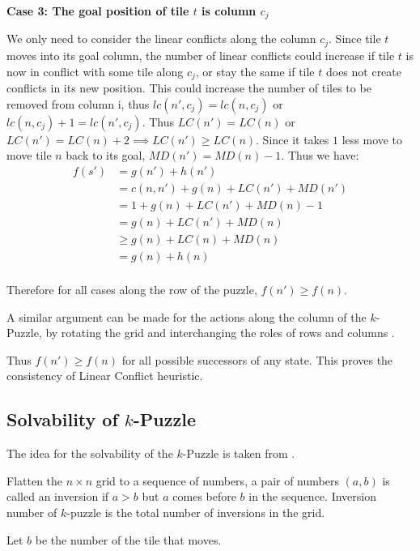 \documentclass{llncs}
\begin{document}
\textbf{Case 3: The goal position of tile $t$ is column $c_j$}

We only need to consider the linear conflicts along the column $c_j$. Since tile $t$ moves into its goal column, the number of linear conflicts could increase if tile $t$ is now in conflict with some tile along $c_j$, or stay the same if tile $t$ does not create conflicts in its new position. This could increase the number of tiles to be removed from column i, thus $lc(n',c_j) =lc(n,c_j)$ or $lc(n,c_j)+1 = lc(n',c_j)$. Thus $LC(n') = LC(n)$ or $LC(n') = LC(n) + 2 \implies LC(n') \geq LC(n)$. Since it takes $1$ less move to move tile $n$ back to its goal, $MD(n') = MD(n) - 1$. Thus we have:
\begin{align}
    f(s') \nonumber &= g(n') + h(n') \\\nonumber
        &= c(n,n') + g(n) + LC(n') + MD(n') \\\nonumber
        &= 1 + g(n) + LC(n') + MD(n) - 1 \\\nonumber
        &= g(n) + LC(n') + MD(n) \\\nonumber
        &\geq g(n) + LC(n) + MD(n) \\\nonumber
        &= g(n) + h(n) \\\nonumber
\end{align}

Therefore for all cases along the row of the puzzle, $f(n') \geq f(n)$. 

A similar argument can be made for the actions along the column of the $k$-Puzzle, by rotating the grid and interchanging the roles of rows and columns .

Thus $f(n') \geq f(n)$ for all possible successors of any state. This proves the consistency of Linear Conflict heuristic.

\subsection{Solvability of $k$-Puzzle}
The idea for the solvability of the $k$-Puzzle is taken from \cite{solvability}.
\begin{definition}
Flatten the $n \times n$ grid to a sequence of numbers, a pair of numbers $(a,b)$ is called an inversion if $a>b$ but $a$ comes before $b$ in the sequence. Inversion number of $k$-puzzle is the total number of inversions in the grid.
\end{definition}

Let $b$ be the number of the tile that moves.
\end{document}
